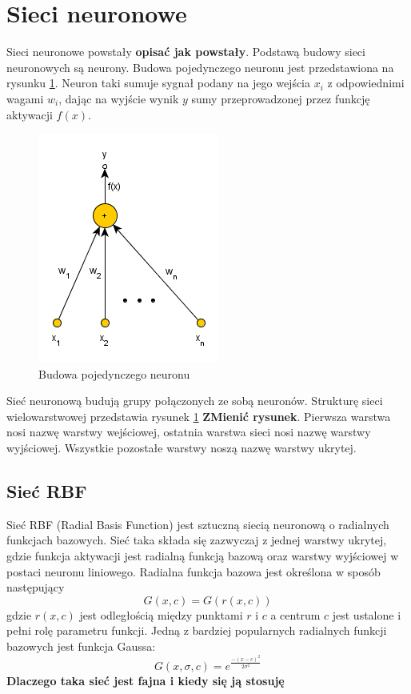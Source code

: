 \section{Sieci neuronowe}
Sieci neuronowe powstały \textbf{opisać jak powstały}. Podstawą budowy sieci neuronowych są neurony. Budowa pojedynczego neuronu jest przedstawiona na rysunku \ref{fig:neuron}. Neuron taki sumuje sygnał podany na jego wejścia $x_i$ z odpowiednimi wagami $w_i$, dając na wyjście wynik $y$ sumy przeprowadzonej przez funkcję aktywacji $f(x)$.
\begin{figure}[ht!]
	\centering
	\includegraphics[scale=0.8]{images/single_neuron.png}
	\caption{Budowa pojedynczego neuronu}
	\label{fig:neuron}
\end{figure}

Sieć neuronową budują grupy połączonych ze sobą neuronów. Strukturę sieci wielowarstwowej przedstawia rysunek \ref{fig:neuron} \textbf{ZMienić rysunek}. Pierwsza warstwa nosi nazwę warstwy wejściowej, ostatnia warstwa sieci nosi nazwę warstwy wyjściowej. Wszystkie pozostałe warstwy noszą nazwę warstwy ukrytej.

\subsection*{Sieć RBF}
Sieć RBF (Radial Basis Function) jest sztuczną siecią neuronową o radialnych funkcjach bazowych. Sieć taka składa się zazwyczaj z jednej warstwy ukrytej, gdzie funkcja aktywacji jest radialną funkcją bazową oraz 
warstwy wyjściowej w postaci neuronu liniowego. Radialna funkcja bazowa jest określona w sposób następujący\cite[str. 1]{Bartkowiak}
\begin{equation}
	G(x,c) = G(r(x,c))
\end{equation}
gdzie $r(x,c)$ jest odległością między punktami $r$ i $c$ a centrum $c$ jest ustalone i pełni rolę parametru funkcji. Jedną z bardziej popularnych radialnych funkcji bazowych jest funkcja Gaussa:
\begin{equation}
	G(x,\sigma,c) = e^{\frac{-(x-c)^2}{2\sigma^2}}
\end{equation}
\textbf{Dlaczego taka sieć jest fajna i kiedy się ją stosuję}


